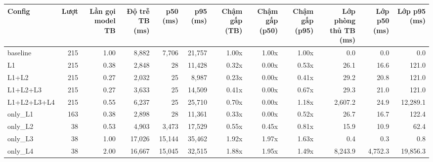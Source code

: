 \begin{tabular}{lrrrrrrrrrrr}
\toprule
Config & Lượt & Lần gọi model TB & Độ trễ TB (ms) & p50 (ms) & p95 (ms) & Chậm gấp (TB) & Chậm gấp (p50) & Chậm gấp (p95) & Lớp phòng thủ TB (ms) & Lớp p50 (ms) & Lớp p95 (ms) \\
\midrule
baseline & 215 & 1.00 & 8,882 & 7,706 & 21,757 & 1.00x & 1.00x & 1.00x & 0.0 & 0.0 & 0.0 \\
L1 & 215 & 0.38 & 2,848 & 28 & 11,428 & 0.32x & 0.00x & 0.53x & 26.1 & 16.6 & 121.0 \\
L1+L2 & 215 & 0.27 & 2,032 & 25 & 8,987 & 0.23x & 0.00x & 0.41x & 29.2 & 20.8 & 121.0 \\
L1+L2+L3 & 215 & 0.27 & 3,633 & 25 & 14,509 & 0.41x & 0.00x & 0.67x & 29.3 & 21.0 & 121.0 \\
L1+L2+L3+L4 & 215 & 0.55 & 6,237 & 25 & 25,710 & 0.70x & 0.00x & 1.18x & 2,607.2 & 24.9 & 12,289.1 \\
only\_L1 & 163 & 0.38 & 2,898 & 28 & 11,361 & 0.33x & 0.00x & 0.52x & 26.7 & 16.7 & 122.4 \\
only\_L2 & 38 & 0.53 & 4,903 & 3,473 & 17,529 & 0.55x & 0.45x & 0.81x & 15.9 & 10.9 & 62.4 \\
only\_L3 & 38 & 1.00 & 17,026 & 15,144 & 35,462 & 1.92x & 1.97x & 1.63x & 0.4 & 0.3 & 0.8 \\
only\_L4 & 38 & 2.00 & 16,667 & 15,045 & 32,515 & 1.88x & 1.95x & 1.49x & 8,243.9 & 4,752.3 & 19,856.3 \\
\bottomrule
\end{tabular}
